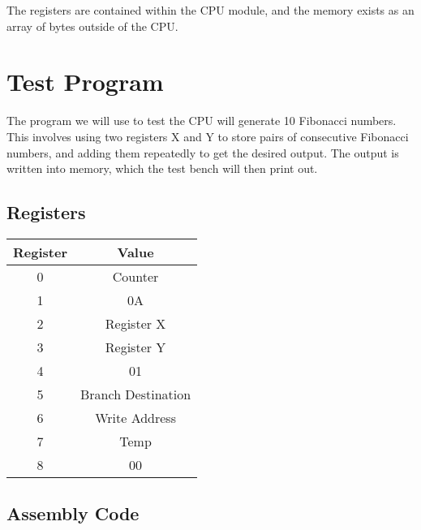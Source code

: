 \documentclass{article}
\begin{document}
\raggedright

The registers are contained within the CPU module, and the memory exists as an array of bytes outside of the CPU.

\section{Test Program}

The program we will use to test the CPU will generate 10 Fibonacci numbers. This involves using two registers X and Y to store pairs of consecutive Fibonacci numbers, and adding them repeatedly to get the desired output. The output is written into memory, which the test bench will then print out.

\subsection{Registers}

\centering

\vspace{1em}
\begin{tabular}{|c|c|}
    \hline
    Register & Value \\
    \hline
    0 & Counter \\
    1 & 0A \\
    2 & Register X \\
    3 & Register Y \\
    4 & 01 \\
    5 & Branch Destination \\
    6 & Write Address \\
    7 & Temp \\
    8 & 00 \\
    \hline
\end{tabular}

\raggedright

\subsection{Assembly Code}

\centering
\end{document}
